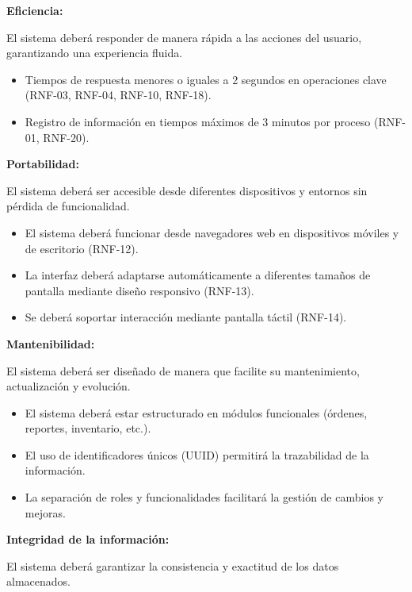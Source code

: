\documentclass[12pt,a4paper]{article}
\begin{document}
\textbf{Eficiencia:}

El sistema deberá responder de manera rápida a las acciones del usuario, garantizando una experiencia fluida.

\begin{itemize}
  \item Tiempos de respuesta menores o iguales a 2 segundos en operaciones clave (RNF-03, RNF-04, RNF-10, RNF-18).

  \item Registro de información en tiempos máximos de 3 minutos por proceso (RNF-01, RNF-20).
\end{itemize}

\textbf{Portabilidad:}

El sistema deberá ser accesible desde diferentes dispositivos y entornos sin pérdida de funcionalidad.

\begin{itemize}
  \item El sistema deberá funcionar desde navegadores web en dispositivos móviles y de escritorio (RNF-12).

  \item La interfaz deberá adaptarse automáticamente a diferentes tamaños de pantalla mediante diseño responsivo (RNF-13).

  \item Se deberá soportar interacción mediante pantalla táctil (RNF-14).
\end{itemize}

\textbf{Mantenibilidad:}

El sistema deberá ser diseñado de manera que facilite su mantenimiento, actualización y evolución.

\begin{itemize}
  \item El sistema deberá estar estructurado en módulos funcionales (órdenes, reportes, inventario, etc.).

  \item El uso de identificadores únicos (UUID) permitirá la trazabilidad de la información.

  \item La separación de roles y funcionalidades facilitará la gestión de cambios y mejoras.
\end{itemize}

\textbf{Integridad de la información:}

El sistema deberá garantizar la consistencia y exactitud de los datos almacenados.
\end{document}
